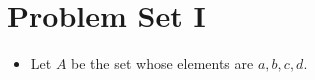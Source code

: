 \documentclass{article}
\begin{document}
\section{Problem Set I}
\begin{itemize}
  \item Let \( A \) be the set whose elements are \( a,b,c,d \).
    
\end{itemize}


\end{document}
